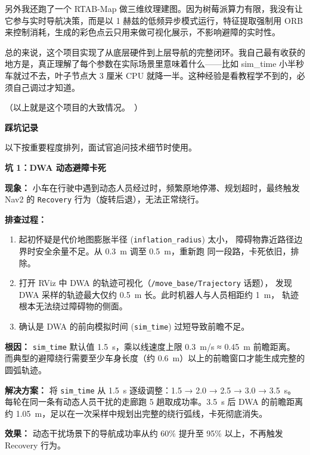 \documentclass[11pt,a4paper]{article}
\begin{document}
另外我还跑了一个 RTAB-Map 做三维纹理建图。因为树莓派算力有限，我没有让它参与实时导航决策，而是以 1 赫兹的低频异步模式运行，特征提取强制用 ORB 来控制消耗，生成的彩色点云只用来做可视化展示，不影响避障的实时性。

总的来说，这个项目实现了从底层硬件到上层导航的完整闭环。我自己最有收获的地方是，真正理解了每个参数在实际场景里意味着什么——比如 sim\_time 小半秒车就过不去，叶子节点大 3 厘米 CPU 就降一半。这种经验是看教程学不到的，必须自己调过才知道。

（以上就是这个项目的大致情况。\ ）

\vspace{1em}
\noindent\textbf{踩坑记录}

以下按重要程度排列，面试官追问技术细节时使用。

\vspace{1em}

\textbf{坑 1：DWA 动态避障卡死}

\textbf{现象：}
小车在行驶中遇到动态人员经过时，频繁原地停滞、规划超时，最终触发 Nav2 的
\texttt{Recovery} 行为（旋转后退），无法正常绕行。

\textbf{排查过程：}
\begin{enumerate}
  \item 起初怀疑是代价地图膨胀半径 (\texttt{inflation\_radius}) 太小，
        障碍物靠近路径边界时安全余量不足。从 0.3~m 调至 0.5~m，重新跑
        同一段路，卡死依旧，排除。
  \item 打开 RViz 中 DWA 的轨迹可视化（\texttt{/move\_base/Trajectory} 话题），
        发现 DWA 采样的轨迹最大仅约 0.5~m 长。此时机器人与人员相距约 1~m，
        轨迹根本无法绕过障碍物的侧面。
  \item 确认是 DWA 的前向模拟时间 (\texttt{sim\_time}) 过短导致前瞻不足。
\end{enumerate}

\textbf{根因：}
\texttt{sim\_time} 默认值 1.5~s，乘以线速度上限 0.3~m/s ≈ 0.45~m 前瞻距离。
而典型的避障绕行需要至少车身长度（约 0.6~m）以上的前瞻窗口才能生成完整的
圆弧轨迹。

\textbf{解决方案：}
将 \texttt{sim\_time} 从 1.5~s 逐级调整：1.5 → 2.0 → 2.5 → 3.0 → 3.5~s。
每轮在同一条有动态人员干扰的走廊跑 5 趟取成功率。3.5~s 后 DWA 的前瞻距离
约 1.05~m，足以在一次采样中规划出完整的绕行弧线，卡死彻底消失。

\textbf{效果：}
动态干扰场景下的导航成功率从约 60\% 提升至 95\% 以上，不再触发 Recovery 行为。

\vspace{2em}
\end{document}
